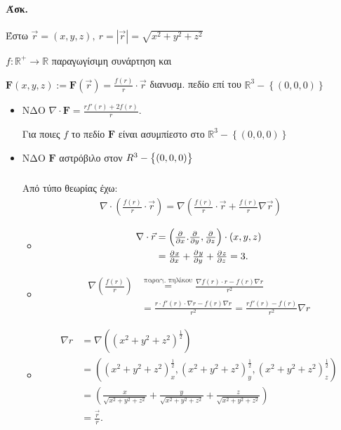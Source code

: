 \documentclass[11pt,a4paper,titlepage]{article}
\begin{document}
\paragraph{Άσκ.}
Έστω \(\vec r = (x,y,z),\ r = |\vec r|=\sqrt{x^2+y^2+z^2}\)

\( f:\mathbb R ^+ \to \mathbb R  \) παραγωγίσιμη συνάρτηση και

\( \mathbf F(x,y,z) := \mathbf F(\vec r) = \frac{f(r)}{r} \cdot \vec r \)
διανυσμ. πεδίο επί του \( \mathbb R ^3 - \left\lbrace (0,0,0) \right\rbrace \)

\begin{itemize}
\item ΝΔΟ \(
\nabla \cdot \mathbf F = \frac{rf'(r)+2f(r)}{r}
\).

Για ποιες \(f\) το πεδίο \( \mathbf F \) είναι ασυμπίεστο στο \( \mathbb R ^3-\left\lbrace (0,0,0) \right\rbrace \)

\item ΝΔΟ \( \mathbf F \) αστρόβιλο στον \( \mathbf \mathbb R ^3 - \left\lbrace (0,0,0) \right\rbrace \)

\subparagraph{}
Από τύπο θεωρίας έχω:
\begin{align}
\nabla \cdot \left(
\frac{f(r)}{r}\cdot \vec r
\right) = \nabla \left(
\frac{f(r)}{r} \cdot \vec r + \frac{f(r)}{r} \nabla \vec r
\right)
\end{align}

\begin{itemize}
\item \begin{align*}
\nabla \cdot \vec r &= \left(\pd{}{x}.\pd{}{y},\pd{}{z} \right) \cdot (x,y,z) \\
&= \pd{x}{x} + \pd{y}{y} + \pd{z}{z} = 3.
\end{align*}

\item \begin{align*}
\nabla \left(
\frac{f(r)}{r}\right) &\overset{\text{παραγ. πηλίκου}}{=} \frac{\nabla f(r) \cdot r - f(r) \nabla r}{r^2} \\
&= \frac{r \cdot f'(r) \cdot \nabla r - f(r) \nabla r }{r^2} = \frac{rf'(r)-f(r)}{r^2}\nabla r
\end{align*}

\item \begin{align*}
\nabla r &= \nabla \left(
(x^2+y^2+z^2)^\frac{1}{2}
\right) \\ &= \left(
(x^2+y^2+z^2)_x^\frac{1}{2},(x^2+y^2+z^2)_y^\frac{1}{2},(x^2+y^2+z^2)_z^\frac{1}{2}
\right) \\
&= \left(
\frac{x}{\sqrt{x^2+y^2+z^2}}+\frac{y}{\sqrt{x^2+y^2+z^2}}+\frac{z}{\sqrt{x^2+y^2+z^2}}
\right) \\ &=
\frac{\vec r}{r}.
\end{align*}


\end{itemize}
\end{itemize}
\end{document}
